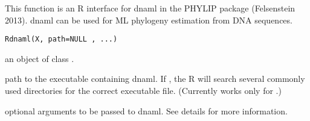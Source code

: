 \documentclass[a4paper]{book}
\begin{document}
%
\begin{SeeAlso}\relax
{}
\end{SeeAlso}
%
\begin{Description}\relax
This function is an R interface for dnaml in the PHYLIP package (Felsenstein 2013). dnaml can be used for ML phylogeny estimation from DNA sequences.
\end{Description}
%
\begin{Usage}
\begin{verbatim}
Rdnaml(X, path=NULL , ...)
\end{verbatim}
\end{Usage}
%
\begin{Arguments}
\begin{ldescription}
\item[\code{X}] an object of class .
\item[\code{path}] path to the executable containing dnaml. If , the R will search several commonly used directories for the correct executable file. (Currently works only for .)
\item[\code{...}] optional arguments to be passed to dnaml. See details for more information.
\end{ldescription}
\end{Arguments}
%
\end{document}
